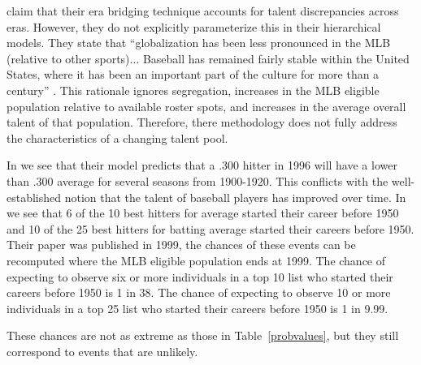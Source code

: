 \documentclass[11pt]{article}\usepackage[]{graphicx}\usepackage[]{color}
\begin{document}
\citet{berry1999eras} claim that their era bridging technique accounts for 
talent discrepancies across eras.  However, they do not explicitly 
parameterize this in their hierarchical models.  They state that 
``globalization has been less pronounced in the MLB (relative to other 
sports)... Baseball has remained fairly stable within the 
United States, where it has been an important part of the culture for more 
than a century'' \citep{berry1999eras}.  This rationale ignores 
segregation, increases in the MLB eligible population 
relative to available roster spots, and increases in the average overall 
talent of that population.  %
Therefore, there methodology does not fully address the characteristics 
of a changing talent pool.  %

In \citet[panel (c) of Figure 7]{berry1999eras} we see that their model 
predicts that a .300 hitter in 1996 will have a lower than .300 average for 
several seasons from 1900-1920.  This conflicts with the well-established 
notion that the talent of baseball players has improved over time.  
In \citet[Table 9]{berry1999eras} we see that 6 of the 10 best hitters 
for average started their career before 1950 and 10 of the 25 best hitters 
for batting average started their careers before 1950.  Their paper was 
published in 1999, the chances of these events can be recomputed where the MLB 
eligible population ends at 1999. %
The chance of expecting to observe six or more individuals in a top 10 
list who started their careers before 1950 is 1 in 38. 
The chance of expecting to observe 10 or more individuals in a top 25 list who 
started their careers before 1950 is 1 in 9.99.  

These chances are not as extreme as those in Table~\ref{probvalues}, 
but they still correspond to events that are unlikely.  
\end{document}
